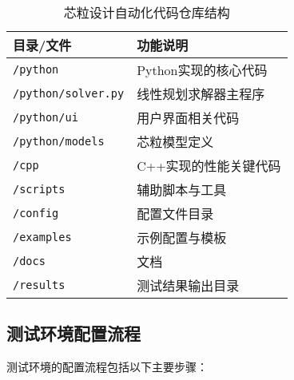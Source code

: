 \documentclass[bachelor]{thesis-uestc}
\begin{document}
\begin{table}[htbp]
\caption{芯粒设计自动化代码仓库结构}
\centering
\begin{tabular}{|l|p{10cm}|}
\hline
\textbf{目录/文件} & \textbf{功能说明} \\
\hline
\texttt{/python} & Python实现的核心代码 \\
\hline
\texttt{/python/solver.py} & 线性规划求解器主程序 \\
\hline
\texttt{/python/ui} & 用户界面相关代码 \\
\hline
\texttt{/python/models} & 芯粒模型定义 \\
\hline
\texttt{/cpp} & C++实现的性能关键代码 \\
\hline
\texttt{/scripts} & 辅助脚本与工具 \\
\hline
\texttt{/config} & 配置文件目录 \\
\hline
\texttt{/examples} & 示例配置与模板 \\
\hline
\texttt{/docs} & 文档 \\
\hline
\texttt{/results} & 测试结果输出目录 \\
\hline
\end{tabular}
\label{tab:chiplet_repo_structure}
\end{table}

\subsection{测试环境配置流程}

测试环境的配置流程包括以下主要步骤：
\end{document}
